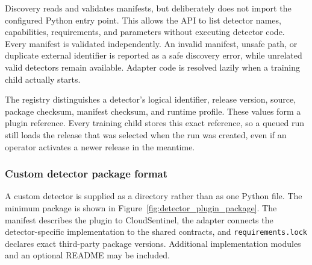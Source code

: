 Discovery reads and validates manifests, but deliberately does not import the configured Python entry point. This allows the API to list detector names, capabilities, requirements, and parameters without executing detector code. Every manifest is validated independently. An invalid manifest, unsafe path, or duplicate external identifier is reported as a safe discovery error, while unrelated valid detectors remain available. Adapter code is resolved lazily when a training child actually starts.

The registry distinguishes a detector's logical identifier, release version, source, package checksum, manifest checksum, and runtime profile. These values form a plugin reference. Every training child stores this exact reference, so a queued run still loads the release that was selected when the run was created, even if an operator activates a newer release in the meantime.

\subsubsection{Custom detector package format}

A custom detector is supplied as a directory rather than as one Python file. The minimum package is shown in Figure~\ref{fig:detector_plugin_package}. The manifest describes the plugin to CloudSentinel, the adapter connects the detector-specific implementation to the shared contracts, and \texttt{requirements.lock} declares exact third-party package versions. Additional implementation modules and an optional README may be included.

